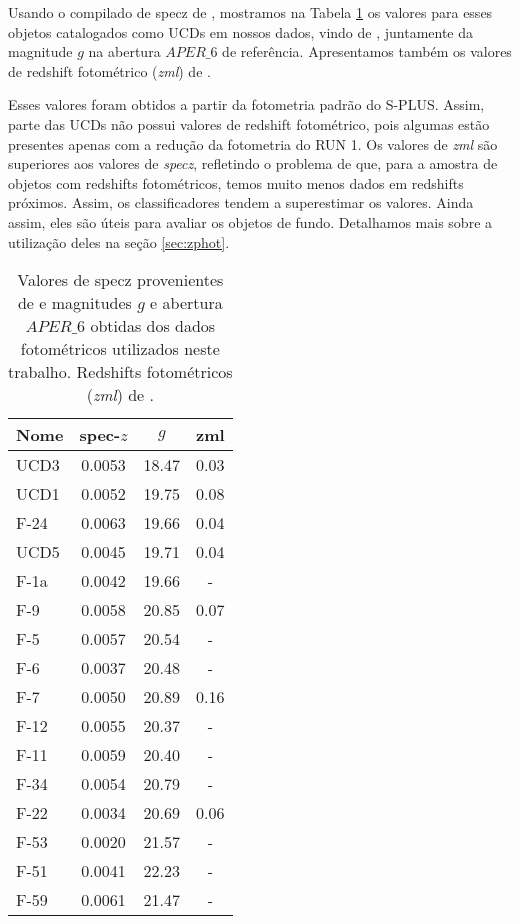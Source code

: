 Usando o compilado de \ac{specz} de \cite{Lima_2024}, mostramos na Tabela \ref{tab:ucds_know_z_gmag} os valores para esses objetos catalogados como UCDs em nossos dados, vindo de \cite{catalog_ucds}, juntamente da magnitude $g$ na abertura $APER\_6$ de referência. Apresentamos também os valores de redshift fotométrico (\textit{zml}) de \citep{erik_photoz_2024}. 

Esses valores foram obtidos a partir da fotometria padrão do S-PLUS. Assim, parte das UCDs não possui valores de redshift fotométrico, pois algumas estão presentes apenas com a redução da fotometria do RUN 1. Os valores de \textit{zml} são superiores aos valores de \textit{specz}, refletindo o problema de que, para a amostra de objetos com redshifts fotométricos, temos muito menos dados em redshifts próximos. Assim, os classificadores tendem a superestimar os valores. Ainda assim, eles são úteis para avaliar os objetos de fundo. Detalhamos mais sobre a utilização deles na seção \ref{sec:zphot}.

\begin{table}[!ht]
    \centering
    \caption{Valores de \ac{specz} provenientes de \cite{Lima_2024} e magnitudes $g$ e abertura $APER\_6$ obtidas dos dados fotométricos utilizados neste trabalho. Redshifts fotométricos (\textit{zml}) de \cite{erik_photoz_2024}.}
    \begin{tabular}{lccc}
        \toprule
        Nome & spec-$z$ & $g$ & zml \\
        \midrule
        UCD3 & 0.0053 & 18.47 & 0.03\\
        UCD1 & 0.0052 & 19.75 & 0.08\\
        F-24 & 0.0063 & 19.66 & 0.04\\
        UCD5 & 0.0045 & 19.71 & 0.04\\
        F-1a & 0.0042 & 19.66 & -\\
        F-9  & 0.0058 & 20.85 & 0.07\\
        F-5  & 0.0057 & 20.54 & -\\
        F-6  & 0.0037 & 20.48 & -\\
        F-7  & 0.0050 & 20.89 & 0.16\\
        F-12 & 0.0055 & 20.37 & -\\
        F-11 & 0.0059 & 20.40 & -\\
        F-34 & 0.0054 & 20.79 & -\\
        F-22 & 0.0034 & 20.69 & 0.06\\
        F-53 & 0.0020 & 21.57 & -\\
        F-51 & 0.0041 & 22.23 & -\\
        F-59 & 0.0061 & 21.47 & -\\
        \bottomrule
    \end{tabular}
    \label{tab:ucds_know_z_gmag}
\end{table}

